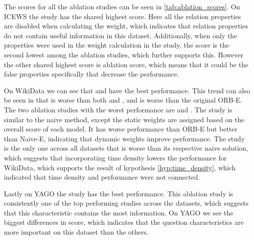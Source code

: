 The scores for all the ablation studies can be seen in \autoref{tab:ablation_scores}. On ICEWS the  study has the shared highest score. 
Here all the relation properties are disabled when calculating the weight, which indicates that relation properties do not contain useful information in this dataset. Additionally, when only the properties were used in the weight calculation in the  study, the score is the second lowest among the ablation studies, which further supports this. However the other shared highest score is  ablation score, which means that it could be the false properties specifically that decrease the performance. 




On WikiData we can see that  and  have the best performance. This trend can also be seen in that  is worse than both  and , and  is worse than the original ORB-E. 
The two ablation studies with the worst performance are  and . 
The  study is similar to the naive method, except the static weights are assigned based on the overall score of each model. It has worse performance than ORB-E but better than Naive-E, indicating that dynamic weights improve performance.
The  study  is the only one across all datasets that is worse than its respective naive solution, which suggests that incorporating time density lowers the performance for WikiData, which supports the result of hypothesis \autoref{hyp:time_density}, which indicated that time density and performance were not connected. 

Lastly on YAGO the study  has the best performance. This ablation study is consistently one of the top performing studies across the datasets, which suggests that this characteristic contains the most information. On YAGO we see the biggest differences in score, which indicates that the question characteristics are more important on this dataset than the others.

